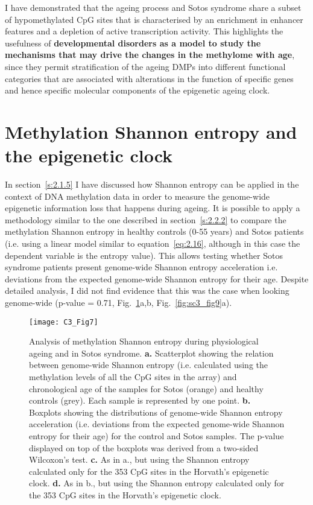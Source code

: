 \bigskip

I have demonstrated that the ageing process and Sotos syndrome share a subset of hypomethylated CpG sites that is characterised by an enrichment in enhancer features and a depletion of active transcription activity. This highlights the usefulness of \textbf{developmental disorders as a model to study the mechanisms that may drive the changes in the methylome with age}, since they permit stratification of the ageing DMPs into different functional categories that are associated with alterations in the function of specific genes and hence specific molecular components of the epigenetic ageing clock.

\smallskip

\section{Methylation Shannon entropy and the epigenetic clock} \label{s:3.5}

\smallskip

In section~\ref{s:2.1.5} I have discussed how Shannon entropy can be applied in the context of DNA methylation data in order to measure the genome-wide epigenetic information loss that happens during ageing. It is possible to apply a methodology similar to the one described in section~\ref{s:2.2.2} to compare the methylation Shannon entropy in healthy controls (0-55 years) and Sotos patients (i.e. using a linear model similar to equation~\ref{eq:2.16}, although in this case the dependent variable is the entropy value). This allows testing whether Sotos syndrome patients present genome-wide Shannon entropy acceleration i.e. deviations from the expected genome-wide Shannon entropy for their age. Despite detailed analysis, I did not find evidence that this was the case when looking genome-wide (p-value = 0.71, Fig.~\ref{fig:c3_fig7}a,b, Fig.~\ref{fig:sc3_fig9}a).

\begin{figure}[htbp!] 
	\centering    
	\texttt{[image: C3\_Fig7]}
	\vspace*{1 mm}
	\caption[Methylation Shannon entropy during physiological ageing and in Sotos syndrome]{Analysis of methylation Shannon entropy during physiological ageing and in Sotos syndrome. \textbf{a.} Scatterplot showing the relation between genome-wide Shannon entropy (i.e. calculated using the methylation levels of all the CpG sites in the array) and chronological age of the samples for Sotos (orange) and healthy controls (grey). Each sample is represented by one point. \textbf{b.} Boxplots showing the distributions of genome-wide Shannon entropy acceleration (i.e. deviations from the expected genome-wide Shannon entropy for their age) for the control and Sotos samples. The p-value displayed on top of the boxplots was derived from a two-sided Wilcoxon’s test. \textbf{c.} As in a., but using the Shannon entropy calculated only for the 353 CpG sites in the Horvath's epigenetic clock. \textbf{d.} As in b., but using the Shannon entropy calculated only for the 353 CpG sites in the Horvath's epigenetic clock.}
	\label{fig:c3_fig7}
\end{figure}

